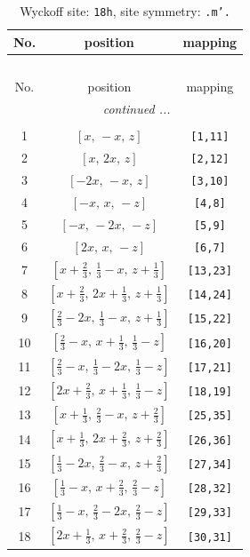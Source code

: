 \documentclass[fleqn,8pt]{jsarticle}
\begin{document}
\renewcommand{\arraystretch}{1.2}
\begin{longtable}{ccc}
\caption{Wyckoff site: {\tt 18h}, site symmetry: {\tt .m'.}}
 \\
 \hline \hline
No. & position & mapping \\ \hline \endfirsthead

\multicolumn{2}{l}{\tablename\ \thetable{}} \\
 \hline \hline
No. & position & mapping \\ \hline \endhead

 \hline \hline
\multicolumn{2}{r}{\footnotesize\it continued ...} \\ \endfoot

 \hline \hline
\multicolumn{2}{r}{} \\ \endlastfoot

1 & $\left[ x,\, - x,\, z \right]$ & {\tt [1,11]} \\ \hline
2 & $\left[ x,\, 2 x,\, z \right]$ & {\tt [2,12]} \\ \hline
3 & $\left[ - 2 x,\, - x,\, z \right]$ & {\tt [3,10]} \\ \hline
4 & $\left[ - x,\, x,\, - z \right]$ & {\tt [4,8]} \\ \hline
5 & $\left[ - x,\, - 2 x,\, - z \right]$ & {\tt [5,9]} \\ \hline
6 & $\left[ 2 x,\, x,\, - z \right]$ & {\tt [6,7]} \\ \hline
7 & $\left[ x + \frac{2}{3},\, \frac{1}{3} - x,\, z + \frac{1}{3} \right]$ & {\tt [13,23]} \\ \hline
8 & $\left[ x + \frac{2}{3},\, 2 x + \frac{1}{3},\, z + \frac{1}{3} \right]$ & {\tt [14,24]} \\ \hline
9 & $\left[ \frac{2}{3} - 2 x,\, \frac{1}{3} - x,\, z + \frac{1}{3} \right]$ & {\tt [15,22]} \\ \hline
10 & $\left[ \frac{2}{3} - x,\, x + \frac{1}{3},\, \frac{1}{3} - z \right]$ & {\tt [16,20]} \\ \hline
11 & $\left[ \frac{2}{3} - x,\, \frac{1}{3} - 2 x,\, \frac{1}{3} - z \right]$ & {\tt [17,21]} \\ \hline
12 & $\left[ 2 x + \frac{2}{3},\, x + \frac{1}{3},\, \frac{1}{3} - z \right]$ & {\tt [18,19]} \\ \hline
13 & $\left[ x + \frac{1}{3},\, \frac{2}{3} - x,\, z + \frac{2}{3} \right]$ & {\tt [25,35]} \\ \hline
14 & $\left[ x + \frac{1}{3},\, 2 x + \frac{2}{3},\, z + \frac{2}{3} \right]$ & {\tt [26,36]} \\ \hline
15 & $\left[ \frac{1}{3} - 2 x,\, \frac{2}{3} - x,\, z + \frac{2}{3} \right]$ & {\tt [27,34]} \\ \hline
16 & $\left[ \frac{1}{3} - x,\, x + \frac{2}{3},\, \frac{2}{3} - z \right]$ & {\tt [28,32]} \\ \hline
17 & $\left[ \frac{1}{3} - x,\, \frac{2}{3} - 2 x,\, \frac{2}{3} - z \right]$ & {\tt [29,33]} \\ \hline
18 & $\left[ 2 x + \frac{1}{3},\, x + \frac{2}{3},\, \frac{2}{3} - z \right]$ & {\tt [30,31]} \\
\end{longtable}
\end{document}
